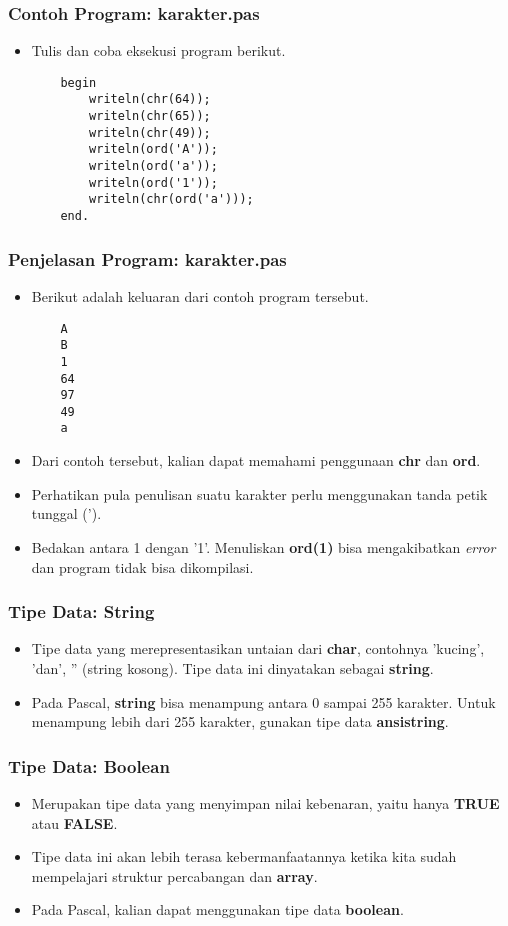 \documentclass{beamer}
\begin{document}
\begin{frame}[fragile]
\frametitle{Contoh Program: karakter.pas}
\begin{itemize}
	\item Tulis dan coba eksekusi program berikut.
	\begin{lstlisting}
	begin
	    writeln(chr(64));
	    writeln(chr(65));
	    writeln(chr(49));
	    writeln(ord('A'));
	    writeln(ord('a'));
	    writeln(ord('1'));
	    writeln(chr(ord('a')));
	end.
	\end{lstlisting}
\end{itemize}
\end{frame}

\begin{frame}[fragile]
\frametitle{Penjelasan Program: karakter.pas}
\begin{itemize}
	\item Berikut adalah keluaran dari contoh program tersebut.
	\begin{lstlisting}
	A
	B
	1
	64
	97
	49
	a
	\end{lstlisting}
	\item Dari contoh tersebut, kalian dapat memahami penggunaan \textbf{chr} dan \textbf{ord}.
	\item Perhatikan pula penulisan suatu karakter perlu menggunakan tanda petik tunggal (').
	\item Bedakan antara 1 dengan '1'. Menuliskan \textbf{ord(1)} bisa mengakibatkan \textit{error} dan program tidak bisa dikompilasi.
\end{itemize}
\end{frame}

\begin{frame}
\frametitle{Tipe Data: String}
\begin{itemize}
	\item Tipe data yang merepresentasikan untaian dari \textbf{char}, contohnya 'kucing', 'dan', '' (string kosong). Tipe data ini dinyatakan sebagai \alert{\textbf{string}}.
	\item Pada Pascal, \textbf{string} bisa menampung antara 0 sampai 255 karakter. Untuk menampung lebih dari 255 karakter, gunakan tipe data \alert{\textbf{ansistring}}.
\end{itemize}
\end{frame}

\begin{frame}
\frametitle{Tipe Data: Boolean}
\begin{itemize}
	\item Merupakan tipe data yang menyimpan nilai kebenaran, yaitu hanya \textbf{TRUE} atau \textbf{FALSE}.
	\item Tipe data ini akan lebih terasa kebermanfaatannya ketika kita sudah mempelajari struktur percabangan dan \textbf{array}.
	\item Pada Pascal, kalian dapat menggunakan tipe data \alert{\textbf{boolean}}.
\end{itemize}
\end{frame}
\end{document}
